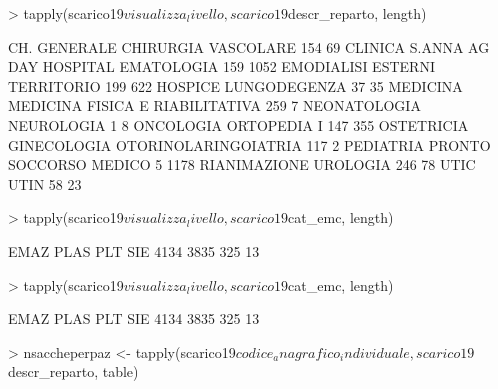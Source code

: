 \documentclass{article}
\begin{document}
\begin{Schunk}
\begin{Sinput}
> tapply(scarico19$visualizza_livello, scarico19$descr_reparto, length)
\end{Sinput}
\begin{Soutput}
                   CH. GENERALE             CHIRURGIA VASCOLARE 
                            154                              69 
              CLINICA S.ANNA AG         DAY HOSPITAL EMATOLOGIA 
                            159                            1052 
                     EMODIALISI              ESTERNI TERRITORIO 
                            199                             622 
                        HOSPICE                    LUNGODEGENZA 
                             37                              35 
                       MEDICINA MEDICINA FISICA E RIABILITATIVA 
                            259                               7 
                   NEONATOLOGIA                      NEUROLOGIA 
                              1                               8 
                      ONCOLOGIA                     ORTOPEDIA I 
                            147                             355 
         OSTETRICIA GINECOLOGIA            OTORINOLARINGOIATRIA 
                            117                               2 
                      PEDIATRIA          PRONTO SOCCORSO MEDICO 
                              5                            1178 
                   RIANIMAZIONE                        UROLOGIA 
                            246                              78 
                           UTIC                            UTIN 
                             58                              23 
\end{Soutput}
\begin{Sinput}
> tapply(scarico19$visualizza_livello, scarico19$cat_emc, length)
\end{Sinput}
\begin{Soutput}
EMAZ PLAS  PLT  SIE 
4134 3835  325   13 
\end{Soutput}
\begin{Sinput}
> tapply(scarico19$visualizza_livello, scarico19$cat_emc, length)
\end{Sinput}
\begin{Soutput}
EMAZ PLAS  PLT  SIE 
4134 3835  325   13 
\end{Soutput}
\end{Schunk}
\begin{Schunk}
\begin{Sinput}
> nsaccheperpaz <- tapply(scarico19$codice_anagrafico_individuale, scarico19$descr_reparto, table)
\end{Sinput}
\end{Schunk}
\end{document}

